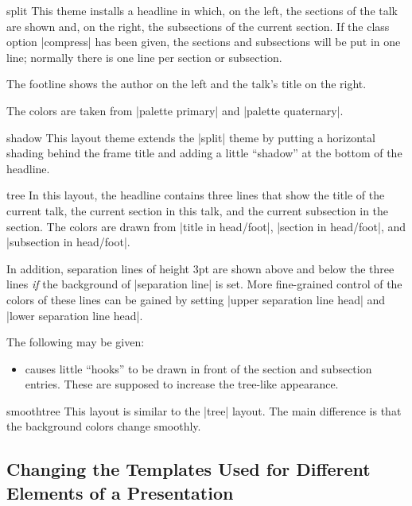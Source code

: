 \begin{outerthemeexample}{split}
  This theme installs a headline in which, on the left, the sections of the talk are shown and, on the right, the subsections of the current section. If the class option |compress| has been given, the sections and subsections will be put in one line; normally there is one line per section or subsection.

  The footline shows the author on the left and the talk's title on the right.

  The colors are taken from |palette primary| and |palette quaternary|.
\end{outerthemeexample}

\begin{outerthemeexample}{shadow}
  This layout theme extends the |split| theme by putting a horizontal shading behind the frame title and adding a little ``shadow'' at the bottom of the headline.
\end{outerthemeexample}

\begin{outerthemeexample}{tree}
  In this layout, the headline contains three lines that show the title of the current talk, the current section in this talk, and the current subsection in the section. The colors are drawn from |title in head/foot|, |section in head/foot|, and |subsection in head/foot|.

  In addition, separation lines of height 3pt are shown above and below the three lines \emph{if} the background of |separation line| is set. More fine-grained control of the colors of these lines can be gained by setting |upper separation line head| and |lower separation line head|.

  The following  may be given:
  \begin{itemize}
  \item
     causes little ``hooks'' to be drawn in front of the section and subsection entries. These are supposed to increase the tree-like appearance.
  \end{itemize}
\end{outerthemeexample}

\begin{outerthemeexample}{smoothtree}
  This layout is similar to the |tree| layout. The main difference is that the background colors change smoothly.
\end{outerthemeexample}


\subsection{Changing the Templates Used for Different Elements of a Presentation}
\label{section-templates}

